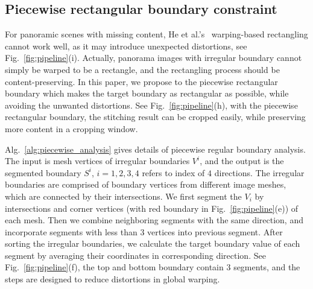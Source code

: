 \documentclass[10pt,journal,compsoc]{IEEEtran}
\begin{document}
\subsection{Piecewise rectangular boundary constraint}
For panoramic scenes with missing content, He et al.'s~\cite{journals/tog/HeC013} warping-based rectangling cannot work well, as it may introduce unexpected distortions, see Fig.~\ref{fig:pipeline}(i).
Actually, panorama images with irregular boundary cannot simply be warped to be a rectangle, and the rectangling process should be content-preserving.
In this paper, we propose to the piecewise rectangular boundary which makes the target boundary as rectangular as possible, while avoiding the unwanted distortions.
See Fig.~\ref{fig:pipeline}(h), with the piecewise rectangular boundary, the stitching result can be cropped easily, while preserving more content in a cropping window.


Alg.~\ref{alg:piecewise_analysis} gives details of piecewise regular boundary analysis.
The input is mesh vertices of irregular boundaries $V^i$, and the output is the segmented boundary $S^i$, $i=1,2,3,4$ refers to index of $4$ directions.
The irregular boundaries are comprised of boundary vertices from different image meshes, which are connected by their intersections.
We first segment the $V_i$ by intersections and corner vertices (with red boundary in Fig.~\ref{fig:pipeline}(e)) of each mesh.
Then we combine neighboring segments with the same direction, and incorporate segments with less than $3$ vertices into previous segment.
After sorting the irregular boundaries, we calculate the target boundary value of each segment by averaging their coordinates in corresponding direction.
See Fig.~\ref{fig:pipeline}(f), the top and bottom boundary contain $3$ segments, and the steps are designed to reduce distortions in global warping.
\end{document}
